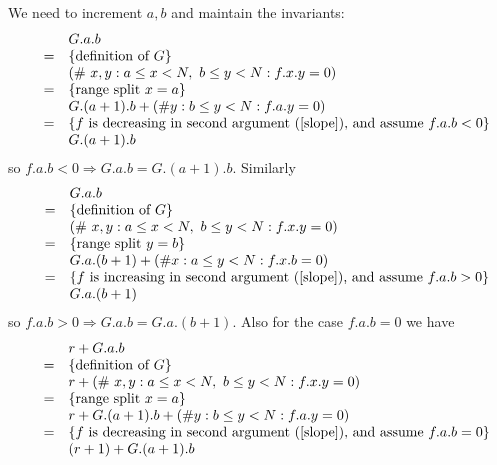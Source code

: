 \noindent We need to increment $a, b$ and maintain the invariants:
\begin{equation*}
\begin{array}{lcl}
		&& G.a.b \\
	      &=& \{ \mbox{definition of $G$} \} \\      
                  && (\#\ x, y: a \leq x < N,\  b \leq y < N: f.x.y = 0) \\
                &=& \{  \text{range split } x = a \} \\
                  &&  G.(a + 1).b + (\# y: b \leq y < N:f.a.y = 0)  \\
                 &=& \{ \mbox{$f$ is decreasing in second argument (\ref{slope}), and assume } f.a.b < 0 \} \\
                 && G.(a + 1).b 
   \end{array}
\end{equation*}
so $f.a.b < 0 \Rightarrow G.a.b = G.(a + 1).b$. Similarly
\begin{equation*}
\begin{array}{lcl}
		&& G.a.b \\
	      &=& \{ \mbox{definition of $G$} \} \\      
                  && (\#\ x, y: a \leq x < N,\  b \leq y < N: f.x.y = 0) \\
                &=& \{  \text{range split } y = b \} \\
                  &&  G.a.(b + 1) + (\# x: a \leq y < N:f.x.b = 0)  \\
                 &=& \{ \mbox{$f$ is increasing in second argument (\ref{slope}), and assume } f.a.b > 0 \} \\
                 && G.a.(b + 1) 
   \end{array}
\end{equation*}
so $f.a.b > 0 \Rightarrow G.a.b = G.a.(b + 1)$. Also for the case $f.a.b = 0$ we have
\begin{equation*}
\begin{array}{lcl}
		&& r + G.a.b \\
	      &=& \{ \mbox{definition of $G$} \} \\      
                  && r + (\#\ x, y: a \leq x < N,\  b \leq y < N: f.x.y = 0) \\
                &=& \{  \text{range split } x = a \} \\
                  &&  r + G.(a + 1).b + (\# y: b \leq y < N:f.a.y = 0)  \\
                 &=& \{ \mbox{$f$ is decreasing in second argument (\ref{slope}), and assume } f.a.b = 0 \} \\
                 && (r + 1) +  G.(a + 1).b 
 \end{array}
\end{equation*} 

